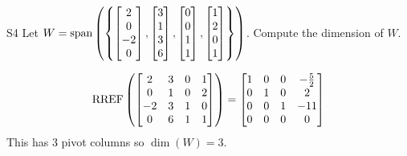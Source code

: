 \documentclass{sbgLAexam}
\begin{document}
\begin{problem}{S4}  
Let $W={\rm span}\left(\left\{\begin{bmatrix} 2 \\ 0 \\ -2 \\ 0 \end{bmatrix}, \begin{bmatrix} 3 \\ 1 \\ 3 \\ 6 \end{bmatrix}, \begin{bmatrix} 0 \\ 0 \\ 1 \\ 1 \end{bmatrix}, \begin{bmatrix}1 \\ 2 \\ 0 \\ 1 \end{bmatrix}\right\}\right)$. Compute the dimension of $W$.
\end{problem}
\begin{solution}
$$\operatorname{RREF}\left( \begin{bmatrix} 2 & 3 & 0 & 1 \\ 0 & 1 & 0 & 2 \\ -2 & 3 & 1 & 0 \\ 0 & 6 & 1 & 1\end{bmatrix} \right) = \begin{bmatrix}1 & 0 & 0 & -\frac{5}{2} \\ 0 & 1 & 0 & 2 \\ 0 & 0 & 1 & -11\\ 0 & 0 & 0 & 0  \end{bmatrix} $$
This has 3 pivot columns so  $\dim(W) =3$.
\end{solution}
\end{document}
